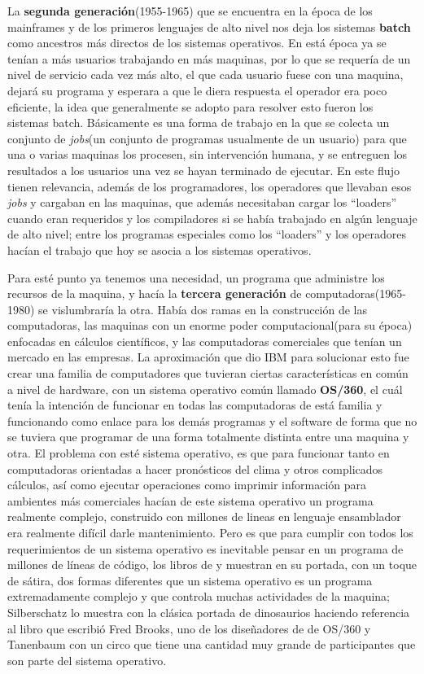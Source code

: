 \documentclass[letterpaper,12pt,oneside]{book}
\begin{document}
		La \textbf{segunda generación}(1955-1965) que se encuentra en la época de los mainframes y de los primeros lenguajes de alto nivel nos deja
		los sistemas \textbf{batch} como ancestros más directos de los sistemas operativos. En está época ya se tenían a más usuarios trabajando en más maquinas, por
		lo que se requería de un nivel de servicio cada vez más alto, el que cada usuario fuese con una maquina, dejará su programa y esperara a que le diera
		respuesta el operador era poco eficiente, la idea que generalmente se adopto para resolver esto fueron los sistemas batch. Básicamente es una forma de trabajo
		en la que se colecta un conjunto de \textit{jobs}(un conjunto de programas usualmente de un usuario) para que una o varias maquinas los procesen, sin intervención 
		humana, y se entreguen los resultados a los usuarios una vez se hayan terminado de ejecutar. En este flujo tienen relevancia, además de los programadores,
		los operadores que llevaban esos \textit{jobs} y cargaban en las maquinas, que además necesitaban cargar los ``loaders'' cuando eran requeridos y los
		compiladores si se había trabajado en algún lenguaje de alto nivel; entre los programas especiales como los ``loaders'' y los operadores hacían
		el trabajo que hoy se asocia a los sistemas operativos.
		
		Para esté punto ya tenemos una necesidad, un programa que administre los recursos de la maquina,  y hacía la \textbf{tercera generación} de computadoras(1965-1980)
		se vislumbraría la otra. Había dos ramas en la construcción de las computadoras, las maquinas con un enorme poder computacional(para su época) enfocadas
		en cálculos científicos, y las computadoras comerciales que tenían un mercado en las empresas. La aproximación que dio IBM para solucionar esto
		fue crear una familia de computadores que tuvieran ciertas características en común a nivel de hardware, con un sistema operativo común llamado
		\textbf{OS/360}, el cuál tenía la intención de funcionar en todas las computadoras de está familia y funcionando como enlace para los demás programas y el software
		de forma que no se tuviera que programar de una forma totalmente distinta entre una maquina y otra. El problema con esté sistema operativo, es que para funcionar
		tanto en computadoras orientadas a hacer pronósticos del clima y otros complicados cálculos, así como ejecutar operaciones como imprimir información
		para ambientes más comerciales hacían de este sistema operativo un programa realmente complejo, construido con millones de lineas en lenguaje ensamblador
		era realmente difícil darle mantenimiento. Pero es que para cumplir con todos los requerimientos de un sistema operativo es inevitable pensar en un programa
		de millones de líneas de código, los libros de \cite{tanenbaum_modern_2002} y \cite{silberschatz_operating_2009} muestran en su portada, con un toque de sátira,
		dos formas diferentes que un sistema operativo es un programa extremadamente complejo y que controla muchas actividades de la maquina; Silberschatz lo muestra
		con la clásica portada de dinosaurios haciendo referencia al libro que escribió Fred Brooks, uno de los diseñadores de de OS/360 y Tanenbaum con un circo que
		tiene una cantidad muy grande de participantes que son parte del sistema operativo.
		
\end{document}

